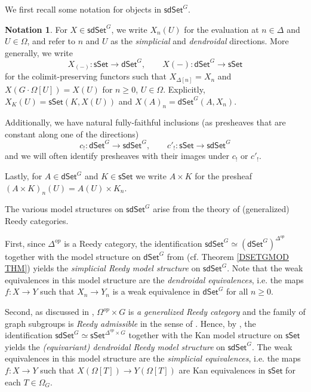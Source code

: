 \documentclass[a4paper,10pt
,draft
]{article}%
\numberwithin{equation}{section}
\numberwithin{figure}{section}
\theoremstyle{definition} %
\newtheorem{notation}[equation]{Notation}%
\newcommand{\longto}{\longrightarrow}%
\newcommand{\sSet}{\ensuremath{\mathsf{sSet}}}%
\newcommand{\dSet}{\mathsf{dSet}}
\newcommand{\1}{\ensuremath{\mathbbm 1}}%
\begin{document}
We first recall some notation for objects in $\mathsf{sdSet}^G$.

\begin{notation}
      For $X \in \mathsf{sdSet}^G$, we write $X_n(U)$ for the evaluation at $n \in \Delta$ and $U \in \Omega$,
      and refer to $n$ and $U$ as the \textit{simplicial} and \textit{dendroidal} directions.
      More generally, we write
      \begin{equation}
            \label{SDSET_EQ}
            X_{(-)} \colon \sSet \to \dSet^G,
            \qquad
            X(-) \colon \dSet^G \to \sSet
      \end{equation}
      for the colimit-preserving functors
      such that $X_{\Delta[n]} = X_n$ and 
      $X\left(G \cdot\Omega[U]\right) = X(U)$ for $n \geq 0$, $U \in \Omega$.
      Explicitly, $X_K(U) = \sSet(K, X(U))$ and $X(A)_n = \dSet^G(A, X_n)$.
      
	Additionally, we have natural fully-faithful inclusions
	(as presheaves that are constant along one of the directions)
\[
	c_{!} \colon \dSet^G \longto \mathsf{sdSet}^G,
		\qquad
	c'_! \colon \sSet \longto \mathsf{sdSet}^G
\]
	and we will often identify presheaves with their images under $c_!$ or $c'_!$.

	Lastly, for $A \in \dSet^G$ and $K \in \sSet$ we write $A \times K$ for the presheaf $(A \times K)_n(U) = A(U) \times K_n$.
\end{notation}


The various model structures on $\mathsf{sdSet}^G$ arise
from the theory of (generalized) Reedy categories.


First, since $\Delta^{op}$ is a Reedy category,
the identification
$\mathsf{sdSet}^G \simeq 
\left(\mathsf{dSet}^G\right)^{\Delta^{op}}$
together with the model structure on 
$\mathsf{dSet}^G$ from \cite{Per18}
(cf. Theorem \ref{DSETGMOD THM})
yields the 
\textit{simplicial Reedy model structure} on $\mathsf{sdSet}^G$.
Note that the weak equivalences in this model structure
are the \textit{dendroidal equivalences},
i.e. the maps
$f \colon X \to Y$
such that $X_n \to Y_n$ is a weak equivalence in $\dSet^G$ for all $n \geq 0$.

Second, as discussed in 
\cite[Ex. A.7]{BP_edss},
$\Omega^{op} \times G$ is \emph{a generalized Reedy category}
and the family of {\color{blue} graph subgroups} is
\emph{Reedy admissible}
in the sense of \cite[Ex. A.2]{BP_edss}.
Hence, by \cite[Thm. A.8]{BP_edss},
the identification 
$\mathsf{sdSet}^G \simeq 
\mathsf{sSet}^{\Delta^{op} \times G}$
together with the Kan model structure on 
$\mathsf{sSet}$
yields the 
\textit{(equivariant) dendroidal Reedy model structure} on $\mathsf{sdSet}^G$.
The weak equivalences in this model structure are the
\emph{simplicial equivalences},
i.e. the maps $f \colon X \to Y$
such that 
$X(\Omega[T]) \to Y(\Omega[T])$
are Kan equivalences in $\mathsf{sSet}$
for each $T \in \Omega_G$.
\end{document}
